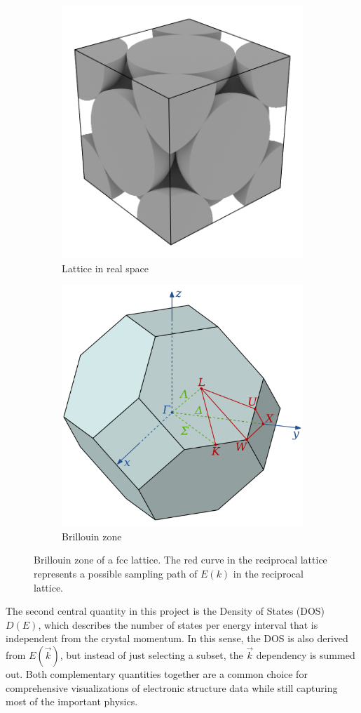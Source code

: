 \begin{figure}[htb!]
    \centering
    \begin{subfigure}{.5\textwidth}
        \centering
        \includegraphics[width=0.5\linewidth]{christian/fcc_real.png}
        \caption{Lattice in real space}
        \label{fig:fcc_real}
    \end{subfigure}%
    \begin{subfigure}{.5\textwidth}
        \centering
        \includegraphics[width=0.5\linewidth]{christian/Brillouin_Zone_(1st,_FCC).png}
        \caption{Brillouin zone}
        \label{fig:fcc_billouin}
    \end{subfigure}
    \caption{Brillouin zone of a fcc lattice. The red curve in the reciprocal lattice represents a possible sampling path of $E(k)$ in the reciprocal lattice.}
    \label{fcc}
\end{figure}

The second central quantity in this project is the Density of States (DOS) $D(E)$, which describes the number of states per energy interval that is independent from the crystal momentum. In this sense, the DOS is also derived from $E(\vec{k})$, but instead of just selecting a subset, the $\vec{k}$ dependency is summed out. Both complementary quantities together are a common choice for comprehensive visualizations of electronic structure data while still capturing most of the important physics. 

